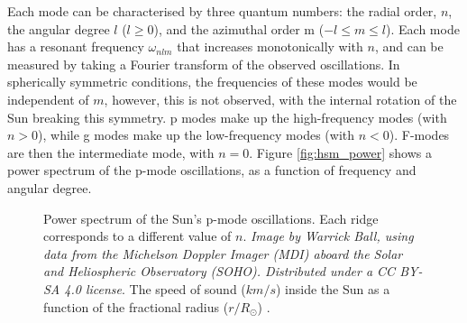 \documentclass[11pt,a4paper,onecolumn]{report}
\begin{document}
Each mode can be characterised by three quantum numbers: the radial order,
\(n\), the angular degree \(l\) (\(l \geq 0\)), and the azimuthal order m (\(-l
\leq m \leq l\)). Each mode has a resonant frequency \(\omega_{nlm}\) that
increases monotonically with \(n\), and can be measured by taking a Fourier
transform of the observed oscillations. In spherically symmetric conditions, the
frequencies of these modes would be independent of \(m\), however, this is not
observed, with the internal rotation of the Sun breaking this symmetry. p modes
make up the high-frequency modes (with \(n>0\)), while g modes make up the
low-frequency modes (with \(n<0\)). F-modes are then the intermediate mode, with
\(n=0\). Figure \ref{fig:hsm_power} shows a power spectrum of the p-mode
oscillations, as a function of frequency and angular degree. \\

\begin{figure}[t]
  \centering
   \caption{ Power spectrum of the Sun's p-mode
  oscillations. Each ridge corresponds to a different value of \(n\).
  \textit{Image by Warrick Ball, using data from the Michelson Doppler Imager
  (MDI) aboard the Solar and Heliospheric Observatory (SOHO). Distributed under
  a CC BY-SA 4.0 license}.  The speed of sound
  (\(\si{km\per s}\)) inside the Sun as a function of the fractional radius
  (\(\si{r \per R_\odot}\)) \citep{bahcall_solar_2000}.}

\end{figure}
\end{document}
